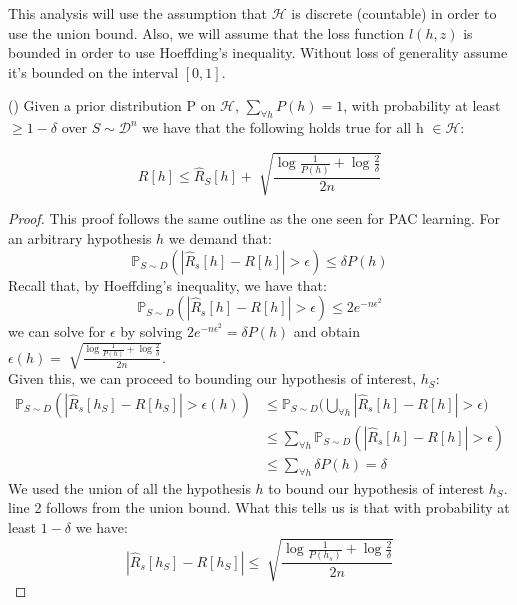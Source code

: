 \documentclass{article}
\begin{document}
This analysis will use the assumption that $\mathcal{H}$ is discrete (countable) in order to use the union bound. Also, we will assume that the loss function $l(h,z)$ is bounded in order to use Hoeffding's inequality. Without loss of generality assume it's bounded on the interval $[0,1]$.





\begin{thm} (\citet{pac-bayes})
Given a prior distribution P on $\mathcal{H}$, \(\sum_{\forall h} P(h)=1\), with probability at least \(\geq 1-\delta\) over $S \sim \mathcal{D}^n$ we have that the following holds true for all h $\in \mathcal{H}$:

\[
 R[h]\leq \hat{R}_S[h]+\sqrt[]{\frac{\log\frac{1}{P(h)}+\log\frac{2}{\delta}}{2n}}
\]
\end{thm}

\begin{proof}
This proof follows the same outline as the one seen for PAC learning. For an arbitrary hypothesis $h$ we demand that: 
\[
\mathbb{P}_{S\sim D}(|\hat{R}_s[h]-R[h]| > \epsilon)\leq \delta P(h)
\]
Recall that, by Hoeffding's inequality, we have that: 
\[
\mathbb{P}_{S\sim D}(|\hat{R}_s[h]-R[h]| > \epsilon)\leq 2e^{ -n\epsilon^2}
\]
we can solve for $\epsilon$ by solving $2e^{ -n\epsilon^2} = \delta P(h) $ and obtain $\epsilon(h) = \sqrt[]{\frac{\log\frac{1}{P(h)}+\log\frac{2}{\delta}}{2n}}$.\\

Given this, we can proceed to bounding our hypothesis of interest, $h_S$:
\begin{align*}
\mathbb{P}_{S\sim D}(|\hat{R}_s[h_S]-R[h_S]| > \epsilon(h)) & \leq \mathbb{P}_{S\sim D}\big(\bigcup_{\forall h}|\hat{R}_s[h]-R[h]| > \epsilon \big) \\ 
& \leq \sum_{\forall h} \mathbb{P}_{S\sim D}(|\hat{R}_s[h]-R[h]| > \epsilon) \\
& \leq \sum_{\forall h} \delta P(h) = \delta
\end{align*}
We used the union of all the hypothesis $h$ to  bound our hypothesis of interest $h_S$. line 2 follows from the union bound. 
What this tells us is that with probability at least $1-\delta$ we have: $$|\hat{R}_s[h_S]-R[h_S]| \leq \sqrt[]{\frac{\log\frac{1}{P(h_s)}+\log\frac{2}{\delta}}{2n}}$$
\end{proof}
\end{document}
